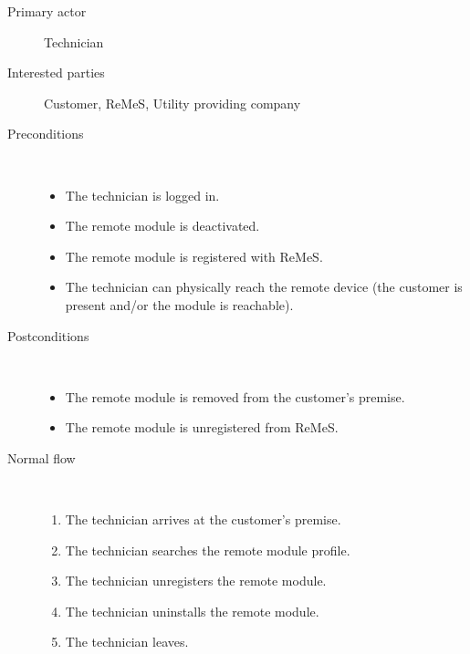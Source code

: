 \begin{description}
	\item[Primary actor] Technician
	\item[Interested parties] Customer, ReMeS, Utility providing company
	\item[Preconditions] \ 
	\begin{itemize}
	  	\item The technician is logged in. 
		\item The remote module is deactivated.
		\item The remote module is registered with ReMeS.
		\item The technician can physically reach the remote device (the customer is
		present and/or the module is reachable).
	\end{itemize}
	\item[Postconditions] \ 
	\begin{itemize}
		\item The remote module is removed from the customer's premise.
		\item The remote module is unregistered from ReMeS.
	\end{itemize}
	\item[Normal flow] \ 
	\begin{enumerate}
	  	\item The technician arrives at the customer's premise.
	  	\item The technician searches the remote module profile.
	  	\item The technician unregisters the remote module.
	  	\item The technician uninstalls the remote module.
	  	\item The technician leaves.
	\end{enumerate}
\end{description}